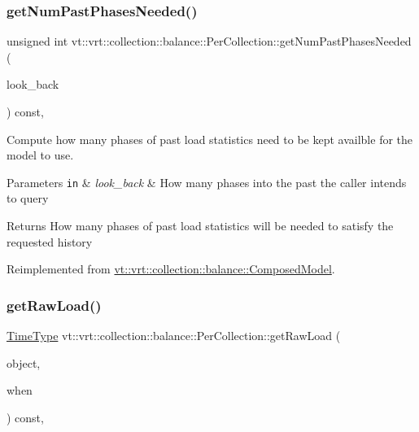 \subsubsection{\texorpdfstring{get\+Num\+Past\+Phases\+Needed()}{getNumPastPhasesNeeded()}}
{\footnotesize\ttfamily unsigned int vt\+::vrt\+::collection\+::balance\+::\+Per\+Collection\+::get\+Num\+Past\+Phases\+Needed (\begin{DoxyParamCaption}\item[{unsigned int}]{look\+\_\+back }\end{DoxyParamCaption}) const\hspace{0.3cm}{\ttfamily [override]}, {\ttfamily [virtual]}}



Compute how many phases of past load statistics need to be kept availble for the model to use. 


\begin{DoxyParams}[1]{Parameters}
\mbox{\tt in}  & {\em look\+\_\+back} & How many phases into the past the caller intends to query\\
\hline
\end{DoxyParams}
\begin{DoxyReturn}{Returns}
How many phases of past load statistics will be needed to satisfy the requested history 
\end{DoxyReturn}


Reimplemented from \hyperlink{classvt_1_1vrt_1_1collection_1_1balance_1_1_composed_model_a20bb994d1b3b27eb2a82729d7d5c30f3}{vt\+::vrt\+::collection\+::balance\+::\+Composed\+Model}.

\mbox{\label{structvt_1_1vrt_1_1collection_1_1balance_1_1_per_collection_af5e29141a1527b165767596336f0d7a6}} 
\subsubsection{\texorpdfstring{get\+Raw\+Load()}{getRawLoad()}}
{\footnotesize\ttfamily \hyperlink{namespacevt_a876a9d0cd5a952859c72de8a46881442}{Time\+Type} vt\+::vrt\+::collection\+::balance\+::\+Per\+Collection\+::get\+Raw\+Load (\begin{DoxyParamCaption}\item[{\hyperlink{namespacevt_1_1vrt_1_1collection_1_1balance_a9f5b53fafb270212279a4757d2c4cd28}{Element\+I\+D\+Struct}}]{object,  }\item[{\hyperlink{structvt_1_1vrt_1_1collection_1_1balance_1_1_phase_offset}{Phase\+Offset}}]{when }\end{DoxyParamCaption}) const\hspace{0.3cm}{\ttfamily [override]}, {\ttfamily [virtual]}}



